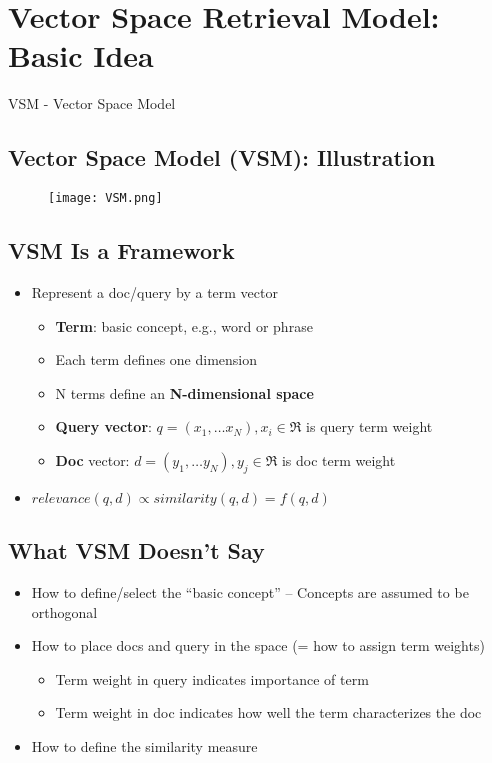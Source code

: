 \newpage
\section{Vector Space Retrieval Model: Basic Idea}

VSM - Vector Space Model

\subsection{Vector Space Model (VSM): Illustration}

\begin{figure}[H]
    \centering
    \texttt{[image: VSM.png]}
\end{figure}


\subsection{VSM Is a Framework}
\begin{itemize}
\item Represent a doc/query by a term vector
\begin{itemize}
\item \textbf{Term}: basic concept, e.g., word or phrase
\item Each term defines one dimension
\item N terms define an \textbf{N-dimensional space}
\item \textbf{Query vector}: $q=(x_1, \dots x_N), x_i \in \Re$ is query term weight 
\item \textbf{Doc} vector: $d=(y_1, \dots y_N), y_j \in \Re$ is doc term weight
\end{itemize}
\item $relevance(q,d) \propto similarity(q,d)=f(q,d)$
\end{itemize}


\subsection{What VSM Doesn’t Say}
\begin{itemize}
\item How to define/select the “basic concept” – Concepts are assumed to be orthogonal
\item How to place docs and query in the space (= how to assign term weights)

\begin{itemize}
\item Term weight in query indicates importance of term 
\item Term weight in doc indicates how well the term characterizes the doc
\end{itemize}

\item How to define the similarity measure
\end{itemize}
